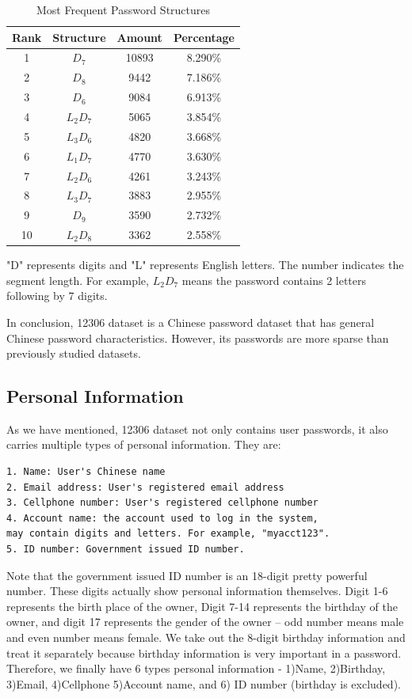\documentclass{sig-alternate}
\begin{document}
\begin{table}
\label{t2}
\centering
\caption{Most Frequent Password Structures}
\begin{tabular}{|c|c|c|c|} \hline
Rank&Structure&Amount&Percentage\\ \hline
1&$D_7$&10893&8.290\%\\ 
2&$D_8$&9442&7.186\%\\ 
3&$D_6$&9084&6.913\%\\ 
4&$L_2D_7$&5065&3.854\%\\ 
5&$L_3D_6$&4820&3.668\%\\ 
6&$L_1D_7$&4770&3.630\%\\ 
7&$L_2D_6$&4261&3.243\%\\ 
8&$L_3D_7$&3883&2.955\%\\ 
9&$D_9$&3590&2.732\%\\ 
10&$L_2D_8$&3362&2.558\%\\ 
\hline\end{tabular}
\begin{tablenotes}
      \small
      \item "D" represents digits and "L" represents English letters. The number indicates the segment length. For example, $L_2D_7$ means the password contains 2 letters following by 7 digits.
    \end{tablenotes}
\end{table}

In conclusion, 12306 dataset is a Chinese password dataset that has general Chinese password characteristics. However, its passwords are more sparse than previously studied datasets. 

\subsection{Personal Information}
As we have mentioned, 12306 dataset not only contains user passwords, it also carries multiple types of personal information. They are:

\begin{verbatim}
1. Name: User's Chinese name
2. Email address: User's registered email address
3. Cellphone number: User's registered cellphone number
4. Account name: the account used to log in the system, 
may contain digits and letters. For example, "myacct123".
5. ID number: Government issued ID number.
\end{verbatim}

Note that the government issued ID number is an 18-digit pretty powerful number. These digits actually show personal information themselves. Digit 1-6 represents the birth place of the owner, Digit 7-14 represents the birthday of the owner, and digit 17 represents the gender of the owner -- odd number means male and even number means female. We take out the 8-digit birthday information and treat it separately because birthday information is very important in a password. Therefore, we finally have 6 types personal information - 1)Name, 2)Birthday, 3)Email, 4)Cellphone 5)Account name, and 6) ID number (birthday is excluded). 
\end{document}
